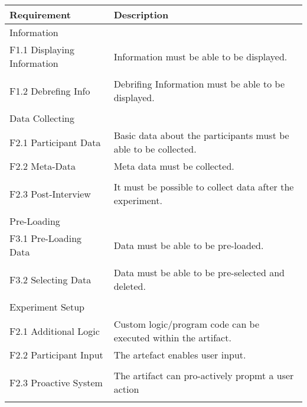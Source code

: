 \begin{table}
    \centering
    \small
    \begin{tabular}{L{0.35\textwidth}L{0.59\textwidth}}
    \hline
    Requirement                     & Description \\ \hline
    Information                 &             \\ \hline
    F1.1 Displaying Information     & Information must be able to be displayed.            \\
     & \\
    F1.2 Debrefing Info             & Debrifing Information must be able to be displayed.           \\
    & \\ \hline
    Data Collecting             &             \\ \hline
    F2.1 Participant Data           & Basic data about the participants must be able to be collected.           \\
    F2.2 Meta-Data                  & Meta data must be collected.            \\
    & \\
    F2.3 Post-Interview             & It must be possible to collect data after the experiment.            \\
    & \\  \hline
    Pre-Loading                 &             \\ \hline
    F3.1 Pre-Loading Data           & Data must be able to be pre-loaded.            \\
    & \\
    F3.2 Selecting Data             & Data must be able to be pre-selected and deleted.           \\
    & \\ \hline
    Experiment Setup            &             \\ \hline
    F2.1 Additional Logic           & Custom logic/program code can be executed within the artifact.            \\
    F2.2 Participant Input          & The artefact enables user input.            \\
    & \\
    F2.3 Proactive System           & The artifact can pro-actively propmt a user action           \\
    & \\ \hline

\end{tabular}
\end{table}
